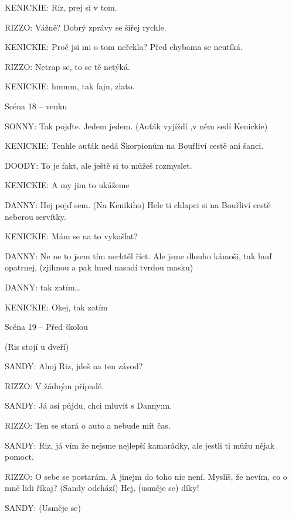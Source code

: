 \rep KENICKIE:        Riz, prej si v tom.

\rep RIZZO:        Vážně? Dobrý zprávy se šířej rychle.

\rep KENICKIE:        Proč jsi mi o tom neřekla? Před chybama se neutíká.

\rep RIZZO:        Netrap se, to se tě netýká. 

\rep KENICKIE:        hmmm, tak fajn, zlato. 





Scéna 18  – venku

\rep SONNY:        Tak pojďte. Jedem jedem. (Auťák vyjíždí ,v něm sedí Kenickie)

\rep KENICKIE:        Tenhle auťák nedá Škorpionům na Bouřliví cestě ani šanci.

\rep DOODY:        To je fakt, ale ještě si to můžeš rozmyslet.  

\rep KENICKIE:        A my jim to ukážeme

\rep DANNY:        Hej pojď sem. (Na Kenikiho) Hele ti chlapci si na Bouřliví cestě neberou         servítky.

\rep KENICKIE:        Mám se na to vykašlat?

\rep DANNY:        Ne ne to jsem tím nechtěl říct. Ale jsme dlouho kámoši, tak buď opatrnej, (zjihnou a pak hned nasadí tvrdou masku)

\rep DANNY:        tak zatím…

\rep KENICKIE:        Okej, tak zatím 





Scéna 19 – Před školou 

(Ris stojí u dveří)

\rep SANDY:        Ahoj Riz, jdeš na ten závod?

\rep RIZZO:        V žádným případě.

\rep SANDY:        Já asi půjdu, chci mluvit s \rep Danny:m.

\rep RIZZO:        Ten se stará o auto a nebude mít čas. 

\rep SANDY:        Riz, já vím že nejsme nejlepší kamarádky, ale jestli ti můžu nějak                 pomoct.

\rep RIZZO:        O sebe se postarám. A jinejm do toho nic není. Myslíš, že nevím, co o         mně lidi říkaj? (Sandy odchází) Hej, (usměje se) díky! 

\rep SANDY:        (Usměje se) 

